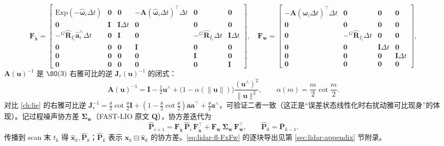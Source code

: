 \begin{equation}
\mathbf{F}_{\tilde{\mathbf{x}}}=\begin{bmatrix}
\mathrm{Exp}(-\hat{\boldsymbol{\omega}}_i\Delta t) & \mathbf{0} & \mathbf{0} & -\mathbf{A}(\hat{\boldsymbol{\omega}}_i\Delta t)^\top\Delta t & \mathbf{0} & \mathbf{0}\\
\mathbf{0} & \mathbf{I} & \mathbf{I}\Delta t & \mathbf{0} & \mathbf{0} & \mathbf{0}\\
-{}^G\hat{\mathbf{R}}_{I_i}\hat{\mathbf{a}}_i^\wedge\Delta t & \mathbf{0} & \mathbf{I} & \mathbf{0} & -{}^G\hat{\mathbf{R}}_{I_i}\Delta t & \mathbf{I}\Delta t\\
\mathbf{0} & \mathbf{0} & \mathbf{0} & \mathbf{I} & \mathbf{0} & \mathbf{0}\\
\mathbf{0} & \mathbf{0} & \mathbf{0} & \mathbf{0} & \mathbf{I} & \mathbf{0}\\
\mathbf{0} & \mathbf{0} & \mathbf{0} & \mathbf{0} & \mathbf{0} & \mathbf{I}
\end{bmatrix},\quad
\mathbf{F}_{\mathbf{w}}=\begin{bmatrix}
-\mathbf{A}(\hat{\boldsymbol{\omega}}_i\Delta t)^\top\Delta t & \mathbf{0} & \mathbf{0} & \mathbf{0}\\
\mathbf{0} & \mathbf{0} & \mathbf{0} & \mathbf{0}\\
\mathbf{0} & -{}^G\hat{\mathbf{R}}_{I_i}\Delta t & \mathbf{0} & \mathbf{0}\\
\mathbf{0} & \mathbf{0} & \mathbf{I}\Delta t & \mathbf{0}\\
\mathbf{0} & \mathbf{0} & \mathbf{0} & \mathbf{I}\Delta t\\
\mathbf{0} & \mathbf{0} & \mathbf{0} & \mathbf{0}
\end{bmatrix},
\label{eq:lidar-fl-FxFw}
\end{equation}
$\mathbf{A}(\mathbf{u})^{-1}$ 是 $\SO(3)$ 右雅可比的逆 $\mathbf{J}_r(\mathbf{u})^{-1}$ 的闭式\cite{bullo1995proportional}：
\begin{equation}
  \mathbf{A}(\mathbf{u})^{-1}=\mathbf{I}-\tfrac12\mathbf{u}^\wedge+\big(1-\alpha(\|\mathbf{u}\|)\big)\frac{(\mathbf{u}^\wedge)^2}{\|\mathbf{u}\|^2},\qquad \alpha(m)=\frac{m}{2}\cot\frac{m}{2}.
  \label{eq:lidar-fl-A}
\end{equation}
对比 \cref{ch:lie} 的右雅可比逆 $\mathbf{J}_r^{-1}=\tfrac{\theta}{2}\cot\tfrac{\theta}{2}\mathbf{I}+(1-\tfrac{\theta}{2}\cot\tfrac{\theta}{2})\mathbf{a}\mathbf{a}^\top+\tfrac{\theta}{2}\mathbf{a}^\wedge$，可验证二者一致（这正是“误差状态线性化时右扰动雅可比现身”的体现）。记过程噪声协方差 $\boldsymbol{\Sigma}_{\mathbf{w}}$（FAST-LIO 原文 $\mathbf{Q}$），协方差迭代为
\begin{equation}
  \hat{\mathbf{P}}_{i+1}=\mathbf{F}_{\tilde{\mathbf{x}}}\,\hat{\mathbf{P}}_i\,\mathbf{F}_{\tilde{\mathbf{x}}}^\top+\mathbf{F}_{\mathbf{w}}\,\boldsymbol{\Sigma}_{\mathbf{w}}\,\mathbf{F}_{\mathbf{w}}^\top,\qquad \hat{\mathbf{P}}_0=\bar{\mathbf{P}}_{k-1}.
  \label{eq:lidar-fl-Pprop}
\end{equation}
传播到 scan 末 $t_k$ 得 $\hat{\mathbf{x}}_k,\hat{\mathbf{P}}_k$；$\hat{\mathbf{P}}_k$ 表示 $\mathbf{x}_k\boxminus\hat{\mathbf{x}}_k$ 的协方差。\cref{eq:lidar-fl-FxFw} 的逐块导出见第 \ref{sec:lidar-appendix} 节附录。

